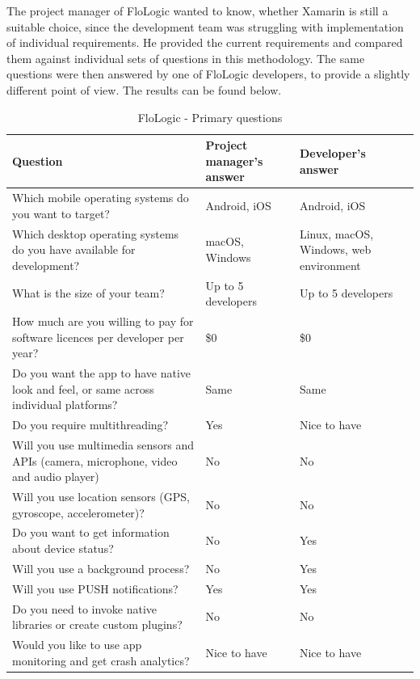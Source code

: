 \documentclass[english,master,public,dept460,male,cpdeclaration,oneside]{diploma}
\begin{document}
The project manager of FloLogic wanted to know, whether Xamarin is still a suitable choice, since the development team was struggling with implementation of individual requirements. He provided the current requirements and compared them against individual sets of questions in this methodology. The same questions were then answered by one of FloLogic developers, to provide a slightly different point of view. The results can be found below.

\begin{table}[!h]
	\centering
	\caption{FloLogic - Primary questions}
	\begin{tabular}{p{5.5cm} | p{3.5cm} | p{3.5cm}}
		\toprule		
		\textbf{Question} &	\textbf{Project manager’s answer} & \textbf{Developer’s answer} \\
		\midrule
		Which mobile operating systems do you want to target? &	Android, iOS & Android, iOS \\
		Which desktop operating systems do you have available for development? & macOS, Windows & Linux, macOS, Windows, web environment \\
		What is the size of your team? & Up to 5 developers & Up to 5 developers \\
		How much are you willing to pay for software licences per developer per year? & \$0 & \$0 \\
		Do you want the app to have native look and feel, or same across individual platforms? & Same & Same \\
		Do you require multithreading? & Yes & Nice to have \\
		Will you use multimedia sensors and APIs (camera, microphone, video and audio player) & No & No \\
		Will you use location sensors (GPS, gyroscope, accelerometer)? & No & No \\
		Do you want to get information about device status? & No & Yes \\
		Will you use a background process? & No & Yes \\
		Will you use PUSH notifications? & Yes & Yes \\
		Do you need to invoke native libraries or create custom plugins? & No & No \\
		Would you like to use app monitoring and get crash analytics? & Nice to have & Nice to have \\		
		\midrule
	\end{tabular}
\end{table}
\end{document}
